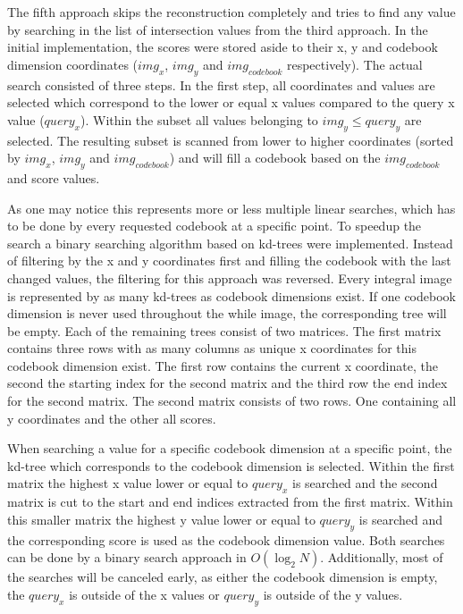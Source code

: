 The fifth approach skips the reconstruction completely and tries to find any value by searching in the list of intersection values from the third approach. In the initial implementation, the scores were stored aside to their x, y and codebook dimension coordinates ($img_x$, $img_y$ and $img_{codebook}$ respectively). The actual search consisted of three steps. In the first step, all coordinates and values are selected which correspond to the lower or equal x values compared to the query x value ($query_x$). Within the subset all values belonging to $img_y \le query_y$ are selected. The resulting subset is scanned from lower to higher coordinates (sorted by $img_x$, $img_y$ and $img_{codebook}$) and will fill a codebook based on the $img_{codebook}$ and score values. %

As one may notice this represents more or less multiple linear searches, which has to be done by every requested codebook at a specific point. To speedup the search a binary searching algorithm based on kd-trees were implemented. %
Instead of filtering by the x and y coordinates first and filling the codebook with the last changed values, the filtering for this approach was reversed. Every integral image is represented by as many kd-trees as codebook dimensions exist. If one codebook dimension is never used throughout the while image, the corresponding tree will be empty. Each of the remaining trees consist of two matrices. The first matrix contains three rows with as many columns as unique x coordinates for this codebook dimension exist. The first row contains the current x coordinate, the second the starting index for the second matrix and the third row the end index for the second matrix. The second matrix consists of two rows. One containing all y coordinates and the other all scores.

When searching a value for a specific codebook dimension at a specific point, the kd-tree which corresponds to the codebook dimension is selected. Within the first matrix the highest x value lower or equal to $query_x$ is searched and the second matrix is cut to the start and end indices extracted from the first matrix. Within this smaller matrix the highest y value lower or equal to $query_y$ is searched and the corresponding score is used as the codebook dimension value. Both searches can be done by a binary search approach in $O(\log_2 N)$. Additionally, most of the searches will be canceled early, as either the codebook dimension is empty, the $query_x$ is outside of the x values or $query_y$ is outside of the y values. %

